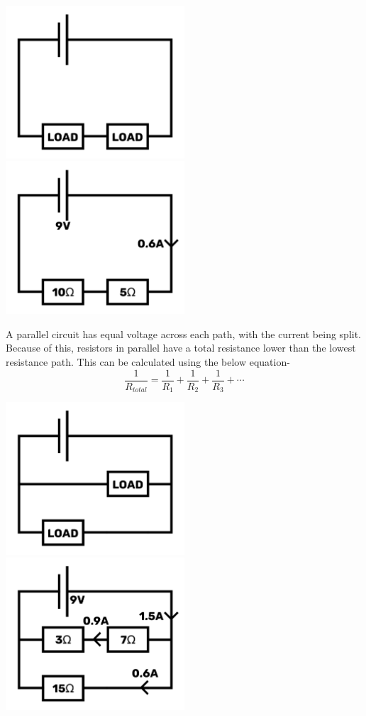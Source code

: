 \documentclass[a4paper,11pt]{report}
\begin{document}
\includegraphics[width=0.5\textwidth]{series1}
\includegraphics[width=0.5\textwidth]{series2}

A parallel circuit has equal voltage across each path, with the current being split. Because of this, resistors in parallel have a total resistance lower than the lowest resistance path.
This can be calculated using the below equation-
\[\frac{1}{R_{total}} = \frac{1}{R_1} + \frac{1}{R_2} + \frac{1}{R_3} + \cdots\]

\includegraphics[width=0.5\textwidth]{parallel1}
\includegraphics[width=0.5\textwidth]{parallel2}
\end{document}
